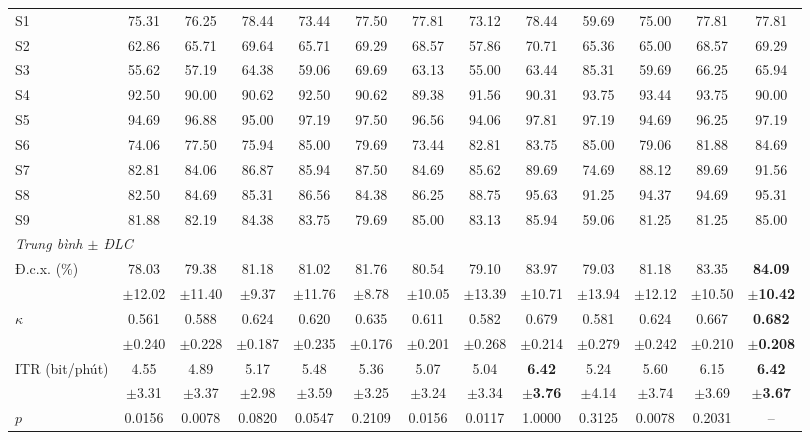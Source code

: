 \documentclass[preprint,12pt]{elsarticle}
\begin{document}
\begin{table}
\begin{adjustbox}{max width=\dimexpr\textheight+80pt\relax}
\begin{tabular}{l@{\hspace{6pt}}cccccc@{\hspace{6pt}}cc@{\hspace{6pt}}ccc@{\hspace{6pt}}c}
S1 & 75.31 & 76.25 & 78.44 & 73.44 & 77.50 & 77.81 & 73.12 & 78.44 & 59.69 & 75.00 & 77.81 & 77.81 \\
S2 & 62.86 & 65.71 & 69.64 & 65.71 & 69.29 & 68.57 & 57.86 & 70.71 & 65.36 & 65.00 & 68.57 & 69.29 \\
S3 & 55.62 & 57.19 & 64.38 & 59.06 & 69.69 & 63.13 & 55.00 & 63.44 & 85.31 & 59.69 & 66.25 & 65.94 \\
S4 & 92.50 & 90.00 & 90.62 & 92.50 & 90.62 & 89.38 & 91.56 & 90.31 & 93.75 & 93.44 & 93.75 & 90.00 \\
S5 & 94.69 & 96.88 & 95.00 & 97.19 & 97.50 & 96.56 & 94.06 & 97.81 & 97.19 & 94.69 & 96.25 & 97.19 \\
S6 & 74.06 & 77.50 & 75.94 & 85.00 & 79.69 & 73.44 & 82.81 & 83.75 & 85.00 & 79.06 & 81.88 & 84.69 \\
S7 & 82.81 & 84.06 & 86.87 & 85.94 & 87.50 & 84.69 & 85.62 & 89.69 & 74.69 & 88.12 & 89.69 & 91.56 \\
S8 & 82.50 & 84.69 & 85.31 & 86.56 & 84.38 & 86.25 & 88.75 & 95.63 & 91.25 & 94.37 & 94.69 & 95.31 \\
S9 & 81.88 & 82.19 & 84.38 & 83.75 & 79.69 & 85.00 & 83.13 & 85.94 & 59.06 & 81.25 & 81.25 & 85.00 \\
\midrule
\multicolumn{13}{l}{\textit{Trung bình $\pm$ ĐLC}} \\
Đ.c.x. (\%) & 78.03 & 79.38 & 81.18 & 81.02 & 81.76 & 80.54 & 79.10 & 83.97 & 79.03 & 81.18 & 83.35 & \textbf{84.09} \\
 & $\pm$12.02 & $\pm$11.40 & $\pm$9.37 & $\pm$11.76 & $\pm$8.78 & $\pm$10.05 & $\pm$13.39 & $\pm$10.71 & $\pm$13.94 & $\pm$12.12 & $\pm$10.50 & \textbf{$\pm$10.42} \\
$\kappa$ & 0.561 & 0.588 & 0.624 & 0.620 & 0.635 & 0.611 & 0.582 & 0.679 & 0.581 & 0.624 & 0.667 & \textbf{0.682} \\
 & $\pm$0.240 & $\pm$0.228 & $\pm$0.187 & $\pm$0.235 & $\pm$0.176 & $\pm$0.201 & $\pm$0.268 & $\pm$0.214 & $\pm$0.279 & $\pm$0.242 & $\pm$0.210 & \textbf{$\pm$0.208} \\
ITR (bit/phút) & 4.55 & 4.89 & 5.17 & 5.48 & 5.36 & 5.07 & 5.04 & \textbf{6.42} & 5.24 & 5.60 & 6.15 & \textbf{6.42} \\
 & $\pm$3.31 & $\pm$3.37 & $\pm$2.98 & $\pm$3.59 & $\pm$3.25 & $\pm$3.24 & $\pm$3.34 & \textbf{$\pm$3.76} & $\pm$4.14 & $\pm$3.74 & $\pm$3.69 & \textbf{$\pm$3.67} \\
\midrule
$p$ & 0.0156 & 0.0078 & 0.0820 & 0.0547 & 0.2109 & 0.0156 & 0.0117 & 1.0000 & 0.3125 & 0.0078 & 0.2031 & -- \\

\end{tabular}
\end{adjustbox}
\end{table}
\end{document}
